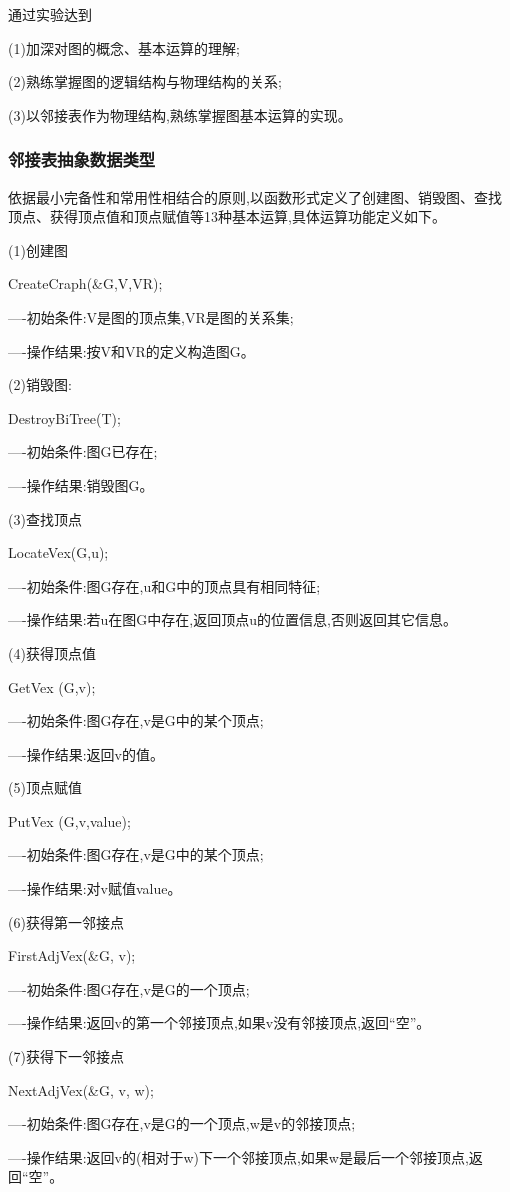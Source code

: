 \documentclass[supercite]{Experimental_Report}
\theoremstyle{definition}
\begin{document}
通过实验达到

(1)加深对图的概念、基本运算的理解;

(2)熟练掌握图的逻辑结构与物理结构的关系;

(3)以邻接表作为物理结构,熟练掌握图基本运算的实现。

\subsubsection{邻接表抽象数据类型}

依据最小完备性和常用性相结合的原则,以函数形式定义了创建图、销毁图、查找顶点、获得顶点值和顶点赋值等13种基本运算,具体运算功能定义如下。

(1)创建图

CreateCraph(\&G,V,VR);

----初始条件:V是图的顶点集,VR是图的关系集;

----操作结果:按V和VR的定义构造图G。

(2)销毁图:

DestroyBiTree(T);

----初始条件:图G已存在;

----操作结果:销毁图G。

(3)查找顶点

LocateVex(G,u);

----初始条件:图G存在,u和G中的顶点具有相同特征;

----操作结果:若u在图G中存在,返回顶点u的位置信息,否则返回其它信息。

(4)获得顶点值

GetVex (G,v);

----初始条件:图G存在,v是G中的某个顶点;

----操作结果:返回v的值。

(5)顶点赋值

PutVex (G,v,value);

----初始条件:图G存在,v是G中的某个顶点;

----操作结果:对v赋值value。

(6)获得第一邻接点

FirstAdjVex(\&G, v);

----初始条件:图G存在,v是G的一个顶点;

----操作结果:返回v的第一个邻接顶点,如果v没有邻接顶点,返回“空”。

(7)获得下一邻接点

NextAdjVex(\&G, v, w);

----初始条件:图G存在,v是G的一个顶点,w是v的邻接顶点;

----操作结果:返回v的(相对于w)下一个邻接顶点,如果w是最后一个邻接顶点,返回“空”。
\end{document}
